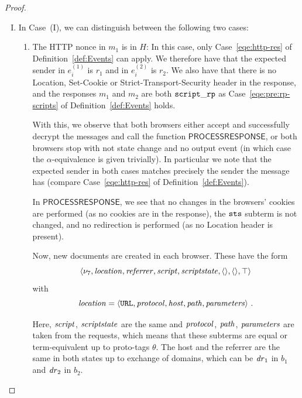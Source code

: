 \begin{proof}
\begin{description}
        \begin{enumerate}[I.]
        \item\label{browser-http-response-normal} 
          In Case~(I), we can distinguish between the following two cases:
          \begin{enumerate}
            \item The HTTP nonce in $m_1$ is in $H$: 
              In this case, only Case~\ref{eqe:http-res} of Definition~\ref{def:Events} can apply. 
              We therefore have that the expected sender in $e_i^{(1)}$ is $r_1$ and in $e_i^{(2)}$ is $r_2$. 
              We also have that there is no Location, Set-Cookie or Strict-Transport-Security header in the response, 
              and the responses $m_1$ and $m_2$ are both $\mathtt{script\_rp}$ as Case~\ref{eqe:pre:rp-scripts} of Definition~\ref{def:Events} holds.
      
              With this, we observe that both browsers either accept and
              successfully decrypt the messages and call the function
              $\mathsf{PROCESSRESPONSE}$, or both browsers stop with not
              state change and no output event (in which case the
              $\alpha$-equivalence is given trivially). In particular we
              note that the expected sender in both cases matches precisely
              the sender the message has (compare Case~\ref{eqe:http-res} of
              Definition~\ref{def:Events}).
      
              In $\mathsf{PROCESSRESPONSE}$, we see that no changes in the
              browsers' cookies are performed (as no cookies are in the
              response), the $\mathtt{sts}$ subterm is not changed, and no
              redirection is performed (as no Location header is present).
      
              Now, new documents are created in each browser. These have the
              form
              \[ \langle\nu_7, \mathit{location}, \mathit{referrer}, \mathit{script},
                \mathit{scriptstate}, \langle\rangle, \langle\rangle, \top\rangle \] with
              \[ \mathit{location} = \langle\mathtt{URL}, \mathit{protocol}, \mathit{host},
                \mathit{path}, \mathit{parameters}\rangle\ .\]
      
            
              Here, $\mathit{script}$, $\mathit{scriptstate}$ are the same and
              $\mathit{protocol}$, $\mathit{path}$, $\mathit{parameters}$ are taken from
              the requests, which means that these subterms are equal or
              term-equivalent up to proto-tags $\theta$. 
              The host and the referrer are the same in both states up to exchange of domains, 
              which can be $\mathit{dr}_1$ in $b_1$ and $\mathit{dr}_2$ in $b_2$.
      

\end{enumerate}
\end{enumerate}
\end{description}
\end{proof}
